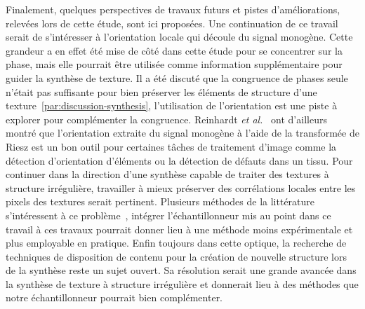 \bigskip

Finalement, quelques perspectives de travaux futurs et pistes d'améliorations, relevées lors de cette étude, sont ici proposées. Une continuation de ce travail serait de s'intéresser à l'orientation locale qui découle du signal monogène. Cette grandeur a en effet été mise de côté dans cette étude pour se concentrer sur la phase, mais elle pourrait être utilisée comme information supplémentaire pour guider la synthèse de texture. Il a été discuté que la congruence de phases seule n'était pas suffisante pour bien préserver les éléments de structure d'une texture~\ref{par:discussion-synthesis}, l'utilisation de l'orientation est une piste à explorer pour complémenter la congruence. Reinhardt \textit{et al.}~\cite{reinhardt_multi-scale_2022} ont d'ailleurs montré que l'orientation extraite du signal monogène à l'aide de la transformée de Riesz est un bon outil pour certaines tâches de traitement d'image comme la détection d'orientation d'éléments ou la détection de défauts dans un tissu. Pour continuer dans la direction d'une synthèse capable de traiter des textures à structure irrégulière, travailler à mieux préserver des corrélations locales entre les pixels des textures serait pertinent. Plusieurs méthodes de la littérature s'intéressent à ce problème~\cite{cavalier_local_2019, heitz_high-performance_2018}, intégrer l'échantillonneur mis au point dans ce travail à ces travaux pourrait donner lieu à une méthode moins expérimentale et plus employable en pratique. Enfin toujours dans cette optique, la recherche de techniques de disposition de contenu pour la création de nouvelle structure lors de la synthèse reste un sujet ouvert. Sa résolution serait une grande avancée dans la synthèse de texture à structure irrégulière et donnerait lieu à des méthodes que notre échantillonneur pourrait bien complémenter.